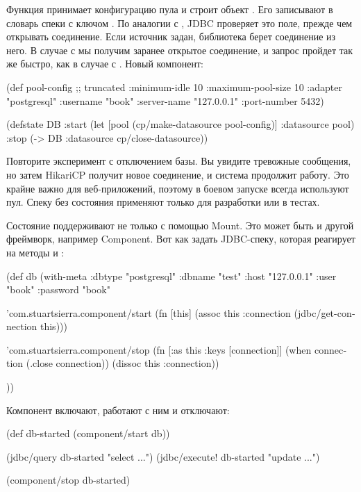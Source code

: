 Функция  принимает конфигурацию пула и строит объект . Его записывают в словарь спеки с ключом . По аналогии с , JDBC проверяет это поле, прежде чем открывать соединение. Если источник задан, библиотека берет соединение из него. В случае с  мы получим заранее открытое соединение, и запрос пройдет так же быстро, как в случае с . Новый компонент:

\begin{english}
  \begin{clojure}
(def pool-config ;; truncated
  {:minimum-idle       10
   :maximum-pool-size  10
   :adapter            "postgresql"
   :username           "book"
   :server-name        "127.0.0.1"
   :port-number        5432})

(defstate DB
  :start
  (let [pool (cp/make-datasource pool-config)]
    {:datasource pool})
  :stop
  (-> DB :datasource cp/close-datasource))
  \end{clojure}
\end{english}

Повторите эксперимент с отключением базы. Вы увидите тревожные сообщения, но затем HikariCP получит новое соединение, и система продолжит работу. Это крайне важно для веб-приложений, поэтому в боевом запуске всегда используют пул. Спеку без состояния применяют только для разработки или в тестах.

Состояние поддерживают не только с помощью Mount. Это может быть и другой фреймворк, например Component. Вот как задать JDBC-спеку, которая реагирует на методы  и :

\begin{english}
  \begin{clojure}
(def db
  (with-meta
    {:dbtype "postgresql"
     :dbname "test"
     :host "127.0.0.1"
     :user "book"
     :password "book"}

    {'com.stuartsierra.component/start
     (fn [this]
       (assoc this :connection
              (jdbc/get-connection this)))

     'com.stuartsierra.component/stop
     (fn [{:as this :keys [connection]}]
       (when connection
         (.close connection))
       (dissoc this :connection))}))
  \end{clojure}
\end{english}

Компонент включают, работают с ним и отключают:

\begin{english}
  \begin{clojure}
(def db-started (component/start db))

(jdbc/query db-started "select ...")
(jdbc/execute! db-started "update ...")

(component/stop db-started)
  \end{clojure}
\end{english}

